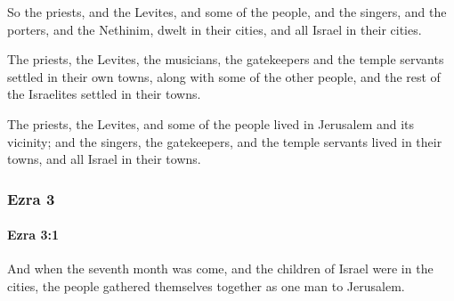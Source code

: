 			\begin{versebox}
					\item[BHS] 
					\item[LXX] 
					\item[ASV] So the priests, and the Levites, and some of the people, and the singers, and the porters, and the Nethinim, dwelt in their cities, and all Israel in their cities.
					\item[NIV] The priests, the Levites, the musicians, the gatekeepers and the temple servants settled in their own towns, along with some of the other people, and the rest of the Israelites settled in their towns.
					\item[NRSV] The priests, the Levites, and some of the people lived in Jerusalem and its vicinity; and the singers, the gatekeepers, and the temple servants lived in their towns, and all Israel in their towns.
			\end{versebox}
	\subsubsection{Ezra 3} %
		\label{EZRA-3}

		\paragraph{Ezra 3:1} %
			\label{EZRA-3-1}

			And when the seventh month was come, and the children of Israel were in the cities, the people gathered themselves together as one man to Jerusalem.

